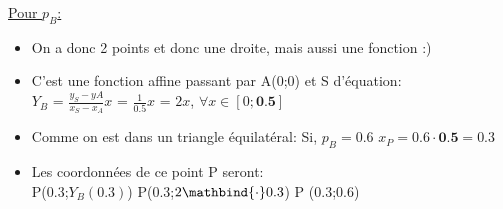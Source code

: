 \documentclass[10pt]{article}
\begin{document}
\begin{minipage}{.43\textwidth}

        \vspace{.5cm}

        \hspace{.5cm} \uline{Pour $p_{B}$:} \\[.125cm]

        \begin{itemize}

                \item On a donc 2 points et donc une droite, mais aussi une fonction :) \\[.25cm]

                \item C'est une fonction affine passant par A(0;0) et S d'équation: \\[.125cm]

                        \hspace{2cm} $Y_{B}$ = $\frac{y_{S} - y{A}}{x_{S} - x_{A}}x$ = $\frac{1}{0.5}x$ = $2x$, $\forall x \in [0; \textbf{0.5}]$ \\[.25cm]


        \item Comme on est dans un triangle équilatéral: Si, $p_{B} = 0.6$ \Leftrightarrow $x_{P} = 0.6 \cdot \textbf{0.5} = 0.3$ \\[.25cm]

        \item Les coordonnées de ce point P seront: \\[.25cm]

                \hspace{1cm} P(0.3;$Y_{B}(0.3)$) \Leftrightarrow  P(0.3;$2\mathbind{\cdot}0.3$) \Leftrightarrow P (0.3;0.6) 

        \end{itemize}

\end{minipage}%
\end{document}
